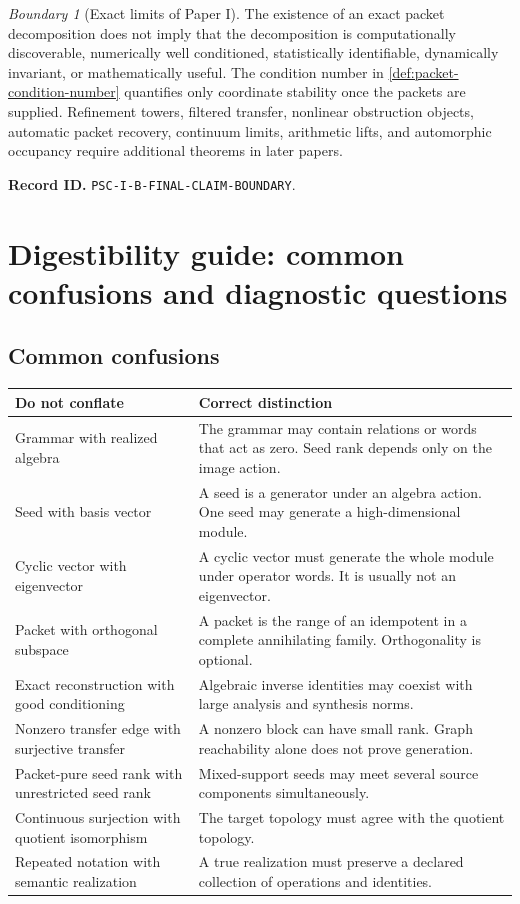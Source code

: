 \documentclass[11pt]{article}
\theoremstyle{definition}
\theoremstyle{remark}
\newtheorem{boundary}[boundary]{Boundary}
\newcommand{\RecordID}[1]{\par\smallskip\noindent\begingroup\footnotesize\color{PSCGray}\raggedright\textbf{Record ID.} \nolinkurl{#1}.\par\endgroup}
\begin{document}
\begin{boundary}[Exact limits of Paper I]
\label{bnd:final-claim-boundary}
The existence of an exact packet decomposition does not imply that the decomposition is computationally discoverable, numerically well conditioned, statistically identifiable, dynamically invariant, or mathematically useful.  The condition number in \cref{def:packet-condition-number} quantifies only coordinate stability once the packets are supplied.  Refinement towers, filtered transfer, nonlinear obstruction objects, automatic packet recovery, continuum limits, arithmetic lifts, and automorphic occupancy require additional theorems in later papers.
\end{boundary}
\RecordID{PSC-I-B-FINAL-CLAIM-BOUNDARY}



\section{Digestibility guide: common confusions and diagnostic questions}

\subsection{Common confusions}
\begin{center}
\begin{longtable}{@{}>{\raggedright\arraybackslash}p{}>{\raggedright\arraybackslash}p{}@{}}
\toprule
\textbf{Do not conflate} & \textbf{Correct distinction}\\
\midrule
\endhead
Grammar with realized algebra & The grammar may contain relations or words that act as zero.  Seed rank depends only on the image action.\\
Seed with basis vector & A seed is a generator under an algebra action.  One seed may generate a high-dimensional module.\\
Cyclic vector with eigenvector & A cyclic vector must generate the whole module under operator words.  It is usually not an eigenvector.\\
Packet with orthogonal subspace & A packet is the range of an idempotent in a complete annihilating family.  Orthogonality is optional.\\
Exact reconstruction with good conditioning & Algebraic inverse identities may coexist with large analysis and synthesis norms.\\
Nonzero transfer edge with surjective transfer & A nonzero block can have small rank.  Graph reachability alone does not prove generation.\\
Packet-pure seed rank with unrestricted seed rank & Mixed-support seeds may meet several source components simultaneously.\\
Continuous surjection with quotient isomorphism & The target topology must agree with the quotient topology.\\
Repeated notation with semantic realization & A true realization must preserve a declared collection of operations and identities.\\
\bottomrule
\end{longtable}
\end{center}
\end{document}
